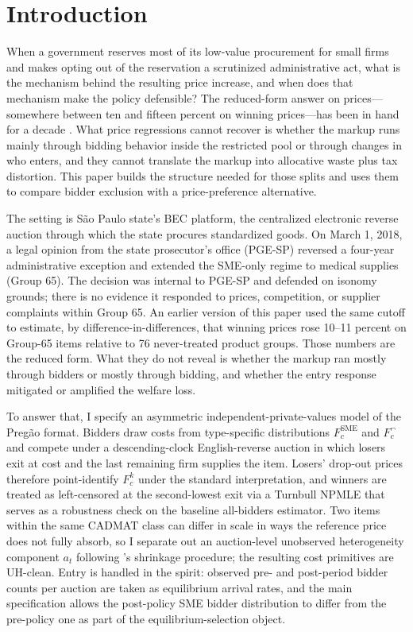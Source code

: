 \section{Introduction}

When a government reserves most of its low-value procurement for small firms and makes opting out of the reservation a scrutinized administrative act, what is the mechanism behind the resulting price increase, and when does that mechanism make the policy defensible? The reduced-form answer on prices---somewhere between ten and fifteen percent on winning prices---has been in hand for a decade \citep{marion2007, krasnokutskaya2011}. What price regressions cannot recover is whether the markup runs mainly through bidding behavior inside the restricted pool or through changes in who enters, and they cannot translate the markup into allocative waste plus tax distortion. This paper builds the structure needed for those splits and uses them to compare bidder exclusion with a price-preference alternative.

The setting is S\~ao Paulo state's BEC platform, the centralized electronic reverse auction through which the state procures standardized goods. On March 1, 2018, a legal opinion from the state prosecutor's office (PGE-SP) reversed a four-year administrative exception and extended the SME-only regime to medical supplies (Group 65). The decision was internal to PGE-SP and defended on isonomy grounds; there is no evidence it responded to prices, competition, or supplier complaints within Group 65. An earlier version of this paper used the same cutoff to estimate, by difference-in-differences, that winning prices rose 10--11 percent on Group-65 items relative to 76 never-treated product groups. Those numbers are the reduced form. What they do not reveal is whether the markup ran mostly through bidders or mostly through bidding, and whether the entry response mitigated or amplified the welfare loss.

To answer that, I specify an asymmetric independent-private-values model of the Preg\~ao format. Bidders draw costs from type-specific distributions $F_c^{\text{SME}}$ and $F_c^{\neg}$ and compete under a descending-clock English-reverse auction in which losers exit at cost and the last remaining firm supplies the item. Losers' drop-out prices therefore point-identify $F_c^k$ under the standard \citet{haile2003} interpretation, and winners are treated as left-censored at the second-lowest exit via a Turnbull NPMLE that serves as a robustness check on the baseline all-bidders estimator. Two items within the same CADMAT class can differ in scale in ways the reference price does not fully absorb, so I separate out an auction-level unobserved heterogeneity component $a_t$ following \citet{krasnokutskaya2011}'s shrinkage procedure; the resulting cost primitives are UH-clean. Entry is handled in the \citet{atheyseira2011} spirit: observed pre- and post-period bidder counts per auction are taken as equilibrium arrival rates, and the main specification allows the post-policy SME bidder distribution to differ from the pre-policy one as part of the equilibrium-selection object.

